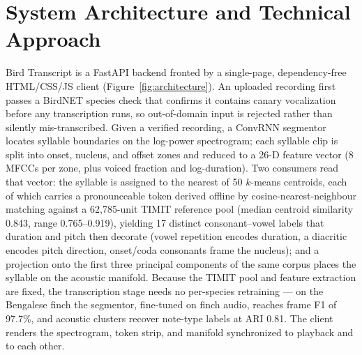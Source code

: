 \documentclass[letterpaper]{article} %
\begin{document}
\section{System Architecture and Technical Approach}
\label{sec:architecture}
Bird Transcript is a FastAPI backend fronted by a single-page,
dependency-free HTML/CSS/JS client (Figure~\ref{fig:architecture}). An
uploaded recording first passes a BirdNET \citep{kahl2021birdnet} species
check that confirms it contains canary vocalization before any transcription
runs, so out-of-domain input is rejected rather than silently
mis-transcribed. Given a verified recording, a ConvRNN segmentor
\citep{das} locates syllable boundaries on the
log-power spectrogram; each syllable clip is split into onset, nucleus, and
offset zones and reduced to a 26-D feature vector (8 MFCCs per zone, plus
voiced fraction \citep{mauch2014pyin} and log-duration). Two consumers read that vector: the syllable is assigned to the nearest of 50
$k$-means centroids, each of which carries a pronounceable token derived
offline by cosine-nearest-neighbour matching against a 62,785-unit TIMIT
reference pool (median centroid similarity 0.843, range 0.765--0.919),
yielding 17 distinct consonant--vowel labels that duration and pitch then
decorate (vowel repetition encodes duration, a diacritic encodes pitch
direction, onset/coda consonants frame the nucleus); and a projection onto the first
three principal components of the same corpus places the syllable on the
acoustic manifold. Because the TIMIT pool and feature extraction are fixed,
the transcription stage needs no per-species retraining --- on the Bengalese
finch \citep{koumura2016} the segmentor, fine-tuned on finch audio, reaches
frame F1 of 97.7\%, and acoustic clusters recover note-type labels at ARI
0.81. The client renders the
spectrogram, token strip, and manifold synchronized to playback and to each
other.
\end{document}
